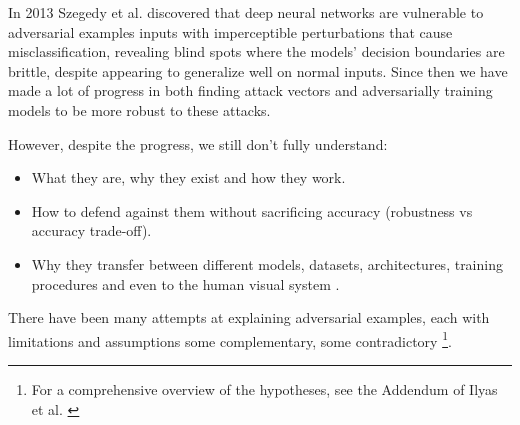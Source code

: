 \documentclass[a4paper, oneside]{discothesis}
\begin{document}





In 2013 Szegedy et al. \cite{cubuk2017intriguing} discovered that deep neural networks are vulnerable to adversarial examples \textendash{} inputs with imperceptible perturbations that cause misclassification, revealing blind spots where the models' decision boundaries are brittle, despite appearing to generalize well on normal inputs. Since then we have made a lot of progress in both finding attack vectors \cite{goodfellow2014explaining} \cite{madry2017towards} \cite{papernot2016limitations} and adversarially training models to be more robust \cite{shafahi2019adversarial} \cite{madry2017towards} \cite{papernot2016distillation} to these attacks.

However, despite the progress, we still don't fully understand:

\begin{itemize}
    \item What they are, why they exist and how they work.
    \item How to defend against them without sacrificing accuracy (robustness vs accuracy trade-off).
    \item Why they transfer between different models, datasets, architectures, training procedures and even to the human visual system \cite{elsayed2018adversarial}.
\end{itemize}

There have been many attempts at explaining adversarial examples, each with limitations and assumptions \textendash{} some complementary, some contradictory  \footnote{For a comprehensive overview of the hypotheses, see the Addendum of Ilyas et al. \cite{ilyas2019adversarial}}.
\end{document}
